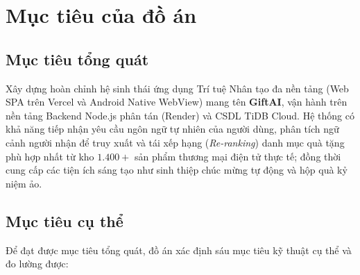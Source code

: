 \section{Mục tiêu của đồ án}

\subsection{Mục tiêu tổng quát}

Xây dựng hoàn chỉnh hệ sinh thái ứng dụng Trí tuệ Nhân tạo đa nền tảng (Web SPA trên Vercel và Android Native WebView) mang tên \textbf{GiftAI}, vận hành trên nền tảng Backend Node.js phân tán (Render) và CSDL TiDB Cloud. Hệ thống có khả năng tiếp nhận yêu cầu ngôn ngữ tự nhiên của người dùng, phân tích ngữ cảnh người nhận để truy xuất và tái xếp hạng (\textit{Re-ranking}) danh mục quà tặng phù hợp nhất từ kho $1.400+$ sản phẩm thương mại điện tử thực tế; đồng thời cung cấp các tiện ích sáng tạo như sinh thiệp chúc mừng tự động và hộp quà kỷ niệm ảo.

\subsection{Mục tiêu cụ thể}

Để đạt được mục tiêu tổng quát, đồ án xác định sáu mục tiêu kỹ thuật cụ thể và đo lường được:

